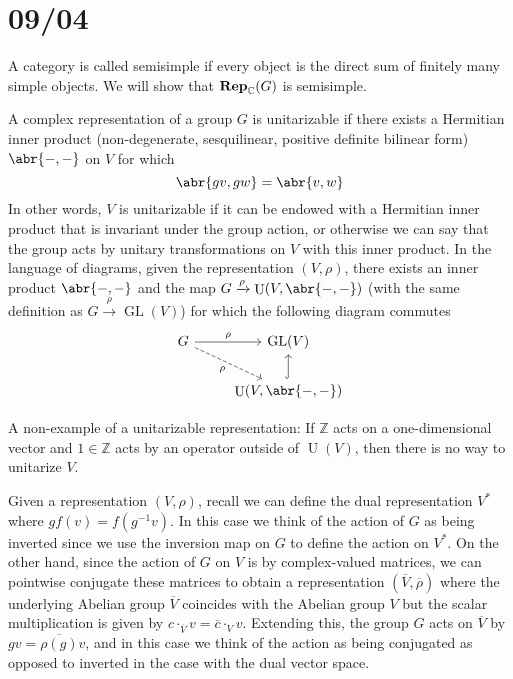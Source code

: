 \documentclass[11pt,leqno]{article}
\theoremstyle{plain}
\theoremstyle{definition}
\numberwithin{equation}{section}
\numberwithin{lem}{section}
\DeclareMathOperator{\GL}{GL}
\DeclareMathOperator{\U}{U}
\newcommand{\catname}[1]{{\normalfont\mathbf{#1}}}
\newcommand{\Rep}{\catname{Rep}}
\begin{document}
\newpage\section{09/04}
A category is called semisimple if every object is the direct sum of finitely many simple objects. We will show that $\Rep_{\mathbb C}(G)$ is semisimple.

A complex representation of a group $G$ is unitarizable if there exists a Hermitian inner product (non-degenerate, sesquilinear, positive definite bilinear form) $\abr{-,-}$ on $V$ for which 
\[\abr{gv,gw} = \abr{v,w}\]
In other words, $V$ is unitarizable if it can be endowed with a Hermitian inner product that is invariant under the group action, or otherwise we can say that the group acts by unitary transformations on $V$ with this inner product. In the language of diagrams, given the representation $(V,\rho)$, there exists an inner product $\abr{-,-}$ and the map $G\xrightarrow{\rho} \U(V,\abr{-,-})$ (with the same definition as $G\xrightarrow{\rho} \GL(V)$) for which the following diagram commutes
\[\begin{tikzcd}
	G & {\GL(V)} \\
	& {\U(V,\abr{-,-})}
	\arrow["\rho", from=1-1, to=1-2]
	\arrow["\rho"', dashed, from=1-1, to=2-2]
	\arrow[hook, from=2-2, to=1-2]
\end{tikzcd}\]

A non-example of a unitarizable representation: If $\mathbb Z$ acts on a one-dimensional vector and $1\in \mathbb Z$ acts by an operator outside of $\U(V)$, then there is no way to unitarize $V$.

Given a representation $(V,\rho)$, recall we can define the dual representation $V^\ast$ where $gf(v) = f(g^{-1}v)$. In this case we think of the action of $G$ as being inverted since we use the inversion map on $G$ to define the action on $V^\ast$. On the other hand, since the action of $G$ on $V$ is by complex-valued matrices, we can pointwise conjugate these matrices to obtain a representation $(\overline V,\overline \rho)$ where the underlying Abelian group $\overline V$ coincides with the Abelian group $V$ but the scalar multiplication is given by $c\cdot_{\overline V} v = \overline{c}\cdot_Vv$. Extending this, the group $G$ acts on $\overline V$ by $gv = \overline{\rho(g)}v$, and in this case we think of the action as being conjugated as opposed to inverted in the case with the dual vector space.
\end{document}
